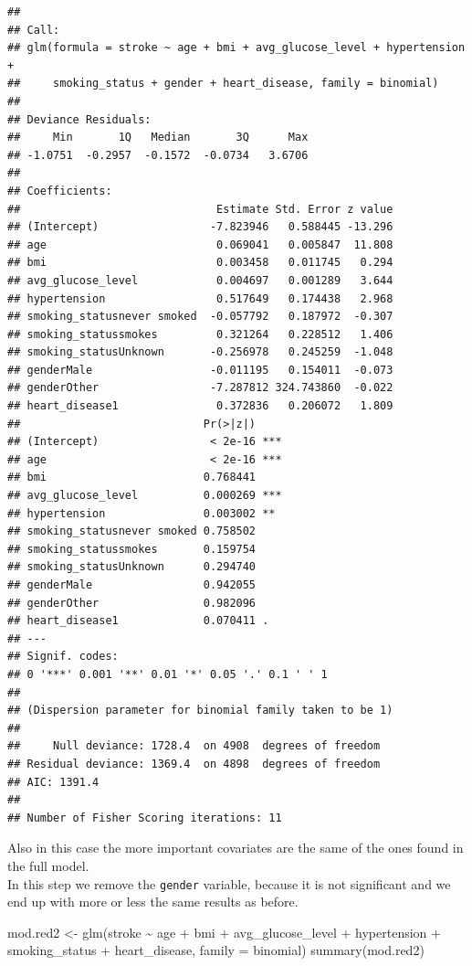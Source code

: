 \documentclass[
]{article}
\newenvironment{Shaded}{\begin{snugshade}}{\end{snugshade}}
\newcommand{\AttributeTok}[1]{\textcolor[rgb]{0.77,0.63,0.00}{#1}}
\newcommand{\FunctionTok}[1]{\textcolor[rgb]{0.00,0.00,0.00}{#1}}
\newcommand{\NormalTok}[1]{#1}
\newcommand{\OtherTok}[1]{\textcolor[rgb]{0.56,0.35,0.01}{#1}}
\newcommand{\SpecialCharTok}[1]{\textcolor[rgb]{0.00,0.00,0.00}{#1}}
\begin{document}
\begin{verbatim}
## 
## Call:
## glm(formula = stroke ~ age + bmi + avg_glucose_level + hypertension + 
##     smoking_status + gender + heart_disease, family = binomial)
## 
## Deviance Residuals: 
##     Min       1Q   Median       3Q      Max  
## -1.0751  -0.2957  -0.1572  -0.0734   3.6706  
## 
## Coefficients:
##                              Estimate Std. Error z value
## (Intercept)                 -7.823946   0.588445 -13.296
## age                          0.069041   0.005847  11.808
## bmi                          0.003458   0.011745   0.294
## avg_glucose_level            0.004697   0.001289   3.644
## hypertension                 0.517649   0.174438   2.968
## smoking_statusnever smoked  -0.057792   0.187972  -0.307
## smoking_statussmokes         0.321264   0.228512   1.406
## smoking_statusUnknown       -0.256978   0.245259  -1.048
## genderMale                  -0.011195   0.154011  -0.073
## genderOther                 -7.287812 324.743860  -0.022
## heart_disease1               0.372836   0.206072   1.809
##                            Pr(>|z|)    
## (Intercept)                 < 2e-16 ***
## age                         < 2e-16 ***
## bmi                        0.768441    
## avg_glucose_level          0.000269 ***
## hypertension               0.003002 ** 
## smoking_statusnever smoked 0.758502    
## smoking_statussmokes       0.159754    
## smoking_statusUnknown      0.294740    
## genderMale                 0.942055    
## genderOther                0.982096    
## heart_disease1             0.070411 .  
## ---
## Signif. codes:  
## 0 '***' 0.001 '**' 0.01 '*' 0.05 '.' 0.1 ' ' 1
## 
## (Dispersion parameter for binomial family taken to be 1)
## 
##     Null deviance: 1728.4  on 4908  degrees of freedom
## Residual deviance: 1369.4  on 4898  degrees of freedom
## AIC: 1391.4
## 
## Number of Fisher Scoring iterations: 11
\end{verbatim}

Also in this case the more important covariates are the same of the ones
found in the full model.\\
In this step we remove the \texttt{gender} variable, because it is not
significant and we end up with more or less the same results as before.

\begin{Shaded}
\begin{Highlighting}[]
\NormalTok{mod.red2 }\OtherTok{\textless{}{-}} \FunctionTok{glm}\NormalTok{(stroke }\SpecialCharTok{\textasciitilde{}}\NormalTok{ age }\SpecialCharTok{+}\NormalTok{ bmi }\SpecialCharTok{+}\NormalTok{ avg\_glucose\_level }\SpecialCharTok{+}\NormalTok{ hypertension }\SpecialCharTok{+} 
\NormalTok{                  smoking\_status  }\SpecialCharTok{+}\NormalTok{ heart\_disease, }\AttributeTok{family =}\NormalTok{ binomial)}
\FunctionTok{summary}\NormalTok{(mod.red2)}
\end{Highlighting}
\end{Shaded}
\end{document}
